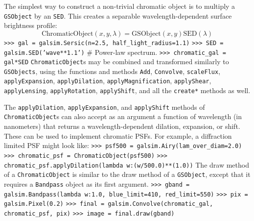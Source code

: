 \documentclass[preprint,11pt]{../../devel/modules/aastex}
\begin{document}
The simplest way to construct a non-trivial chromatic object is to multiply a \texttt{GSObject} by
an \texttt{SED}.  This creates a separable wavelength-dependent surface brightness profile:
\begin{equation}
  \mathrm{ChromaticObject}(x, y, \lambda) = \mathrm{GSObject}(x, y) \mathrm{SED}(\lambda)
\end{equation}
\newline
{\tt >>> gal = galsim.Sersic(n=2.5, half\_light\_radius=1.1)}\newline
{\tt >>> SED = galsim.SED('wave**1.1')} \# Power-law spectrum. \newline
{\tt >>> chromatic\_gal = gal*SED}\newline
\newline
\texttt{ChromaticObject}s may be combined and transformed similarly to \texttt{GSObjects}, using the
functions and methods \texttt{Add}, \texttt{Convolve}, \texttt{scaleFlux}, \texttt{applyExpansion}, \texttt{applyDilation}, \texttt{applyMagnification}, \texttt{applyShear}, \texttt{applyLensing}, \texttt{applyRotation}, \texttt{applyShift}, and all the \texttt{create*} methods as well.

The \texttt{applyDilation}, \texttt{applyExpansion}, and \texttt{applyShift} methods of
\texttt{ChromaticObject}s can also accept as an argument a function of wavelength (in nanometers)
that returns a wavelength-dependent dilation, expansion, or shift.  These can be used to implement
chromatic PSFs.  For example, a diffraction limited PSF might look like: \newline
{\tt >>> psf500 = galsim.Airy(lam\_over\_diam=2.0)}\newline
{\tt >>> chromatic\_psf = ChromaticObject(psf500)}\newline
{\tt >>> chromatic\_psf.applyDilation(lambda w:(w/500.0)**(1.0))}\newline
\newline
The draw method of a \texttt{ChromaticObject} is similar to the draw method of a \texttt{GSObject},
except that it requires a \texttt{Bandpass} object as its first argument.\newline
{\tt >>> gband = galsim.Bandpass(lambda w:1.0, blue\_limit=410, red\_limit=550)} \newline
{\tt >>> pix = galsim.Pixel(0.2)}\newline
{\tt >>> final = galsim.Convolve(chromatic\_gal, chromatic\_psf, pix)}\newline
{\tt >>> image = final.draw(gband)}\newline
\end{document}
